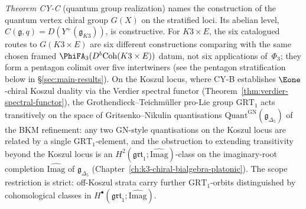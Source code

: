 \emph{Theorem CY-C} (quantum group realization) names
the construction of the quantum vertex
chiral group $G(X)$ on the stratified loci. Its abelian level,
$C(\mathfrak{g}, q) = D(Y^+(\mathfrak{g}_{K3}))$, is
constructive. For $K3 \times E$, the six catalogued routes
to $G(K3 \times E)$ are six different constructions comparing with
the same chosen framed $\PhiFA_3(D^b\mathrm{Coh}(K3\times E))$ datum,
not six applications of~$\Phi_3$; they form a pentagon
colimit over five intertwiners (see the pentagon stratification
below in \S\ref{sec:main-results}). On the Koszul locus, where
CY-B establishes $\Eone$-chiral Koszul duality via the Verdier
spectral functor (Theorem~\ref{thm:verdier-spectral-functor}), the
Grothendieck--Teichm\"uller pro-Lie group $\mathrm{GRT}_1$ acts
transitively on the space of Gritsenko--Nikulin quantisations
$\mathrm{Quant}^{\mathrm{GN}}(\mathfrak{g}_{\Delta_5})$ of the BKM
refinement: any two $\mathrm{GN}$-style quantisations on the Koszul locus
are related by a single $\mathrm{GRT}_1$-element, and the
obstruction to extending transitivity beyond the Koszul locus is an
$H^2(\mathfrak{grt}_1;\widehat{\mathrm{Imag}})$-class on the
imaginary-root completion $\widehat{\mathrm{Imag}}$ of
$\mathfrak{g}_{\Delta_5}$
(Chapter~\ref{ch:k3-chiral-bialgebra-platonic}). The scope
restriction is strict: off-Koszul strata carry further
$\mathrm{GRT}_1$-orbits distinguished by cohomological classes in
$H^\bullet(\mathfrak{grt}_1;\widehat{\mathrm{Imag}})$.

